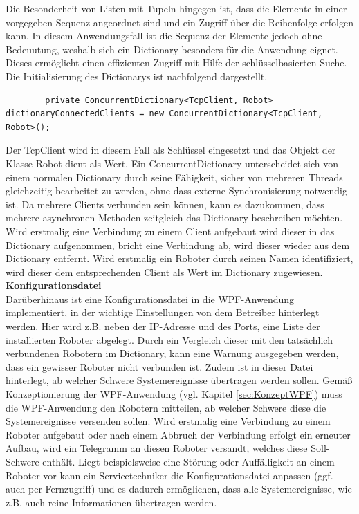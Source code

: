 \documentclass[ a4paper,
                oneside,
                toc=bibliography,
                toc=listof
                ]{scrbook}
\begin{document}
    Die Besonderheit von Listen mit Tupeln hingegen ist, dass die Elemente in einer vorgegeben Sequenz angeordnet sind und ein Zugriff über die Reihenfolge erfolgen kann. In diesem Anwendungsfall ist die Sequenz der Elemente jedoch ohne Bedeuutung, weshalb sich ein Dictionary besonders für die Anwendung eignet. Dieses ermöglicht einen effizienten Zugriff mit Hilfe der schlüsselbasierten Suche. \cite{troelsen2022pro} \cite{kotz2022c}
    Die Initialisierung des Dictionarys ist nachfolgend dargestellt.
    \begin{lstlisting}
    	private ConcurrentDictionary<TcpClient, Robot> dictionaryConnectedClients = new ConcurrentDictionary<TcpClient, Robot>();
    \end{lstlisting}
    Der TcpClient wird in diesem Fall als Schlüssel eingesetzt und das Objekt der Klasse Robot dient als Wert. Ein ConcurrentDictionary unterscheidet sich von einem normalen Dictionary durch seine Fähigkeit, sicher von mehreren Threads gleichzeitig bearbeitet zu werden, ohne dass externe Synchronisierung notwendig ist. Da mehrere Clients verbunden sein können, kann es dazukommen, dass mehrere asynchronen Methoden zeitgleich das Dictionary beschreiben möchten.
   	Wird erstmalig eine Verbindung zu einem Client aufgebaut wird dieser in das Dictionary aufgenommen, bricht eine Verbindung ab, wird dieser wieder aus dem Dictionary entfernt. Wird erstmalig ein Roboter durch seinen Namen identifiziert, wird dieser dem entsprechenden Client als Wert im Dictionary zugewiesen.\vspace{0.5\baselineskip}\\
   	\textbf{Konfigurationsdatei}\\
   	Darüberhinaus ist eine Konfigurationsdatei in die WPF-Anwendung implementiert, in der wichtige Einstellungen von dem Betreiber hinterlegt werden. Hier wird z.B. neben der IP-Adresse und des Ports, eine Liste der installierten Roboter abgelegt. Durch ein Vergleich dieser mit den tatsächlich verbundenen Robotern im Dictionary, kann eine Warnung ausgegeben werden, dass ein gewisser Roboter nicht verbunden ist. Zudem ist in dieser Datei hinterlegt, ab welcher Schwere Systemereignisse übertragen werden sollen. Gemäß Konzeptionierung der WPF-Anwendung (vgl. Kapitel \ref{sec:KonzeptWPF}) muss die WPF-Anwendung den Robotern mitteilen, ab welcher Schwere diese die Systemereignisse versenden sollen. Wird erstmalig eine Verbindung zu einem Roboter aufgebaut oder nach einem Abbruch der Verbindung erfolgt ein erneuter Aufbau, wird ein Telegramm an diesen Roboter versandt, welches diese Soll-Schwere enthält. Liegt beispielsweise eine Störung oder Auffälligkeit an einem Roboter vor kann ein Servicetechniker die Konfigurationsdatei anpassen (ggf. auch per Fernzugriff) und es dadurch ermöglichen, dass alle Systemereignisse, wie z.B. auch reine Informationen übertragen werden.
\end{document}
